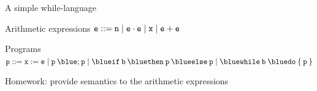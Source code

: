 \documentclass{beamer}
\begin{document}
\begin{frame}{A simple while-language}

        \vspace{0.7cm}
	\begin{block}{Arithmetic expressions}
        $\mathtt{e} ::=  \mathtt{n}  \mid \mathtt{e \cdot e}
        \mid  \mathtt{x}  \mid \mathtt{e + e}$
	\end{block}

	\vspace{0.7cm}
	\begin{block}{Programs}
        $\prog{p} ::= \mathtt{x} := \mathtt{e} \mid
	\mathtt{p \> {\blue ;} \> p} \mid
	\mathtt{{\blue if} \> b \> {\blue then} \> p \> {\blue else} \> p} \mid
	\mathtt{{\blue while} \> b \> {\blue do} \> \{ \> p \> \}}$
	\end{block}

        \vfill
        \pause
        Homework: provide semantics to the arithmetic expressions
\end{frame}
\end{document}
